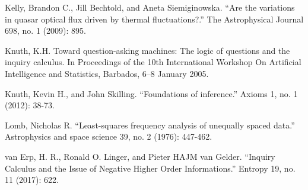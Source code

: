 \documentclass[a4paper, 12pt]{article}
\begin{document}
\begin{thebibliography}{999}
Kelly, Brandon C., Jill Bechtold, and Aneta Siemiginowska. ``Are the variations in quasar optical flux driven by thermal fluctuations?.'' The Astrophysical Journal 698, no. 1 (2009): 895.

Knuth, K.H. Toward question-asking machines: The logic of questions and the inquiry calculus. In
Proceedings of the 10th International Workshop On Artificial Intelligence and Statistics, Barbados, 6–8
January 2005.

Knuth, Kevin H., and John Skilling. ``Foundations of inference.''
Axioms 1, no. 1 (2012): 38-73.

Lomb, Nicholas R. ``Least-squares frequency analysis of unequally spaced data.'' Astrophysics and space science 39, no. 2 (1976): 447-462.

van Erp, H. R., Ronald O. Linger, and Pieter HAJM van Gelder. ``Inquiry Calculus and the Issue of Negative Higher Order Informations.'' Entropy 19, no. 11 (2017): 622.

\end{thebibliography}
\end{document}
